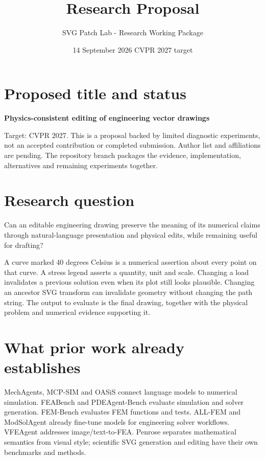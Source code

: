 \documentclass[
  11pt,
  a4paper,
]{article}
\title{Research Proposal}
\author{SVG Patch Lab - Research Working Package}
\date{14 September 2026 \textbar{} CVPR 2027 target}
\let\originaltableofcontents\tableofcontents
\renewcommand{\tableofcontents}{\originaltableofcontents\clearpage}
\begin{document}
\maketitle

{
\setcounter{tocdepth}{2}
\tableofcontents
}
\section{Proposed title and status}\label{proposed-title-and-status}

\textbf{Physics-consistent editing of engineering vector drawings}

Target: CVPR 2027. This is a proposal backed by limited diagnostic
experiments, not an accepted contribution or completed submission.
Author list and affiliations are pending. The repository branch packages
the evidence, implementation, alternatives and remaining experiments
together.

\section{Research question}\label{research-question}

Can an editable engineering drawing preserve the meaning of its
numerical claims through natural-language presentation and physical
edits, while remaining useful for drafting?

A curve marked 40 degrees Celsius is a numerical assertion about every
point on that curve. A stress legend asserts a quantity, unit and scale.
Changing a load invalidates a previous solution even when its plot still
looks plausible. Changing an ancestor SVG transform can invalidate
geometry without changing the path string. The output to evaluate is the
final drawing, together with the physical problem and numerical evidence
supporting it.

\section{What prior work already
establishes}\label{what-prior-work-already-establishes}

MechAgents, MCP-SIM and OASiS connect language models to numerical
simulation. FEABench and PDEAgent-Bench evaluate simulation and solver
generation. FEM-Bench evaluates FEM functions and tests. ALL-FEM and
ModSolAgent already fine-tune models for engineering solver workflows.
VFEAgent addresses image/text-to-FEA. Penrose separates mathematical
semantics from visual style; scientific SVG generation and editing have
their own benchmarks and methods.
\end{document}
